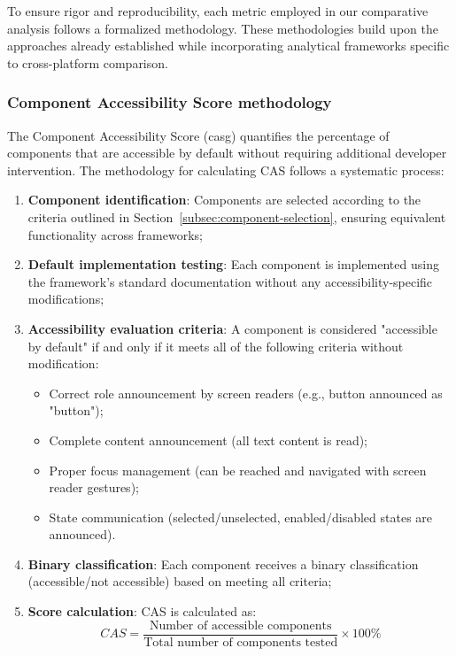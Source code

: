 To ensure rigor and reproducibility, each metric employed in our comparative analysis follows a formalized methodology. These methodologies build upon the approaches already established while incorporating analytical frameworks specific to cross-platform comparison.

\subsubsection{Component Accessibility Score methodology}
\label{subsubsec:cas-methodology}

The Component Accessibility Score (\gls{casg}) quantifies the percentage of components that are accessible by default without requiring additional developer intervention. The methodology for calculating CAS follows a systematic process:

\begin{enumerate}
    \item \textbf{Component identification}: Components are selected according to the criteria outlined in Section~\ref{subsec:component-selection}, ensuring equivalent functionality across frameworks;
    
    \item \textbf{Default implementation testing}: Each component is implemented using the framework's standard documentation without any accessibility-specific modifications;
    
    \item \textbf{Accessibility evaluation criteria}: A component is considered "accessible by default" if and only if it meets all of the following criteria without modification:
    \begin{itemize}
        \item Correct role announcement by screen readers (e.g., button announced as "button");
        \item Complete content announcement (all text content is read);
        \item Proper focus management (can be reached and navigated with screen reader gestures);
        \item State communication (selected/unselected, enabled/disabled states are announced).
    \end{itemize}
    
    \item \textbf{Binary classification}: Each component receives a binary classification (accessible/not accessible) based on meeting all criteria;
    
    \item \textbf{Score calculation}: CAS is calculated as:
    \begin{equation}
    CAS = \frac{\text{Number of accessible components}}{\text{Total number of components tested}} \times 100\%
    \end{equation}
\end{enumerate}

